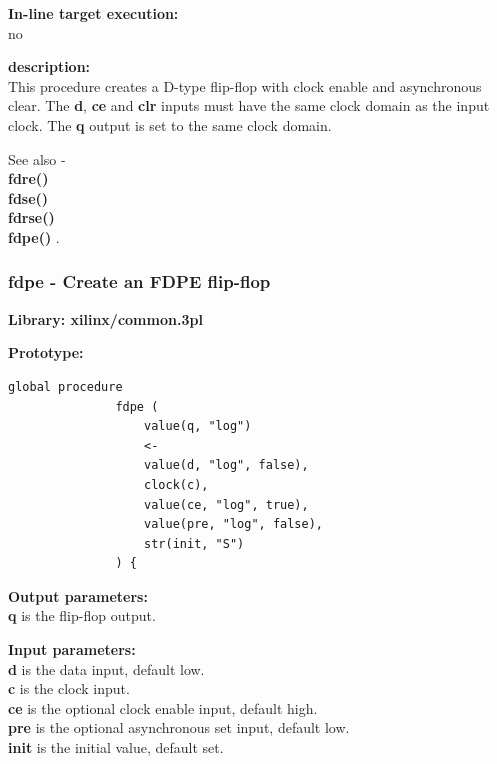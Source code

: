             {\bf In-line target execution:} \\
            no

            {\bf description:} \\
            This procedure creates a D-type flip-flop with clock enable and
            asynchronous clear. The {\bf d}, {\bf ce} and {\bf clr} inputs must
            have the same clock domain as the input clock. The {\bf q} output
            is set to the same clock domain.
            
            See also - \\
            {\bf fdre()} \\
            {\bf fdse()} \\
            {\bf fdrse()} \\
            {\bf fdpe()} .


        \subsubsection{fdpe - Create an FDPE flip-flop}\label{sec:lpfdpe}
            
            {\bf Library: xilinx/common.3pl}

            {\bf Prototype:} \\
            \vsp
            \begin{lstlisting}[gobble=12, language=threepl]
               global procedure
               fdpe (
                   value(q, "log")
                   <-
                   value(d, "log", false),
                   clock(c),
                   value(ce, "log", true),
                   value(pre, "log", false),
                   str(init, "S")
               ) {
            \end{lstlisting}

            {\bf Output parameters:} \\
            {\bf q} is the flip-flop output.

            {\bf Input parameters:} \\            
            {\bf d} is the data input, default low.\\
            {\bf c} is the clock input.\\
            {\bf ce} is the optional clock enable input, default high.\\
            {\bf pre} is the optional asynchronous set input, default low. \\
            {\bf init} is the initial value, default set.
        
